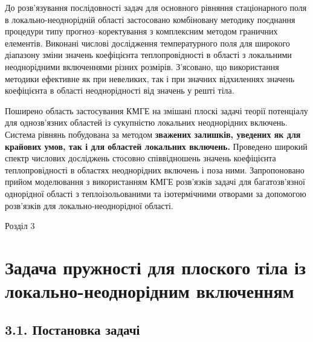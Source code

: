 До розв'язування послідовності задач для основного рівняння
стаціонарного поля в локально-неоднорідній області застосовано
комбіновану методику поєднання процедури типу прогноз--коректування з
комплексним методом граничних елементів. Виконані числові дослідження
температурного поля для широкого діапазону зміни значень коефіцієнта
теплопровідності в області з локальними неоднорідними включеннями різних
розмірів. З'ясовано, що використання методики ефективне як при
невеликих, так і при значних відхиленнях значень коефіцієнта в області
неоднорідності від значень у решті тіла.

Поширено область застосування КМГЕ на змішані плоскі задачі теорії
потенціалу для однозв'язних областей із сукупністю локальних
неоднорідних включень. Система рівнянь побудована за методом
\textbf{зважених залишків, уведених як для крайових умов, так і для
областей локальних включень.} Проведено широкий спектр числових
досліджень стосовно співвідношень значень коефіцієнта теплопровідності в
областях неоднорідних включень і поза ними. Запропоновано прийом
моделювання з використанням КМГЕ розв'язків задачі для багатозв'язної
однорідної області з теплоізольованими та ізотермічними отворами за
допомогою розв'язків для локально-неоднорідної області.

Розділ 3

\hypertarget{ux437ux430ux434ux430ux447ux430-ux43fux440ux443ux436ux43dux43eux441ux442ux456-ux434ux43bux44f-ux43fux43bux43eux441ux43aux43eux433ux43e-ux442ux456ux43bux430-ux456ux437-ux43bux43eux43aux430ux43bux44cux43dux43e-ux43dux435ux43eux434ux43dux43eux440ux456ux434ux43dux438ux43c-ux432ux43aux43bux44eux447ux435ux43dux43dux44fux43c}{%
\section{Задача пружності для плоского тіла із локально-неоднорідним
включенням}\label{ux437ux430ux434ux430ux447ux430-ux43fux440ux443ux436ux43dux43eux441ux442ux456-ux434ux43bux44f-ux43fux43bux43eux441ux43aux43eux433ux43e-ux442ux456ux43bux430-ux456ux437-ux43bux43eux43aux430ux43bux44cux43dux43e-ux43dux435ux43eux434ux43dux43eux440ux456ux434ux43dux438ux43c-ux432ux43aux43bux44eux447ux435ux43dux43dux44fux43c}}

\hypertarget{ux43fux43eux441ux442ux430ux43dux43eux432ux43aux430-ux437ux430ux434ux430ux447ux456-1}{%
\subsection{3.1. Постановка
задачі}\label{ux43fux43eux441ux442ux430ux43dux43eux432ux43aux430-ux437ux430ux434ux430ux447ux456-1}}

